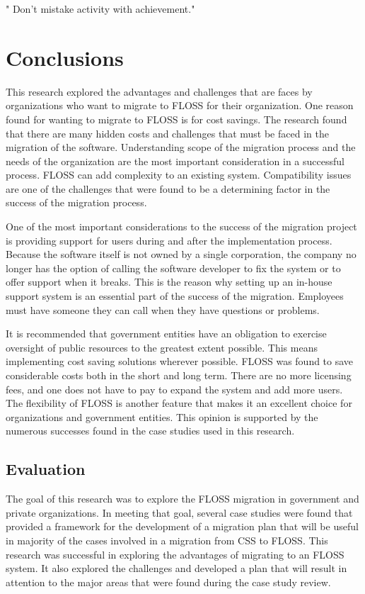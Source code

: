 \newpage
\begin{savequote}[108mm]
 " Don't mistake activity with achievement."
\end{savequote}
\chapter{Conclusions}
\label{chap:conclusions}
\vspace{-2cm}

This research explored the advantages and challenges that are faces by organizations who want to migrate to FLOSS for their organization. One reason found for wanting to migrate to FLOSS is for cost savings. The research found that there are many hidden costs and challenges that must be faced in the migration of the software. Understanding scope of the migration process and the needs of the organization are the most important consideration in a successful process. FLOSS can add complexity to an existing system. Compatibility issues are one of the challenges that were found to be a determining factor in the success of the migration process. 

One of the most important considerations to the success of the migration project is providing support for users during and after the implementation process. Because the software itself is not owned by a single corporation, the company no longer has the option of calling the software developer to fix the system or to offer support when it breaks. This is the reason why setting up an in-house support system is an essential part of the success of the migration. Employees must have someone they can call when they have questions or problems. 

It is recommended that government entities have an obligation to exercise oversight of public resources to the greatest extent possible. This means implementing cost saving solutions wherever possible. FLOSS was found to save considerable costs both in the short and long term. There are no more licensing fees, and one does not have to pay to expand the system and add more users. The flexibility of FLOSS is another feature that makes it an excellent choice for organizations and government entities. This opinion is supported by the numerous successes found in the case studies used in this research. 

\section{Evaluation}
The goal of this research was to explore the FLOSS migration in government and private organizations. In meeting that goal, several case studies were found that provided a framework for the development of a migration plan that will be useful in majority of the cases involved in a migration from CSS to FLOSS. This research was successful in exploring the advantages of migrating to an FLOSS system. It also explored the challenges and developed a plan that will result in attention to the major areas that were found during the case study review.

